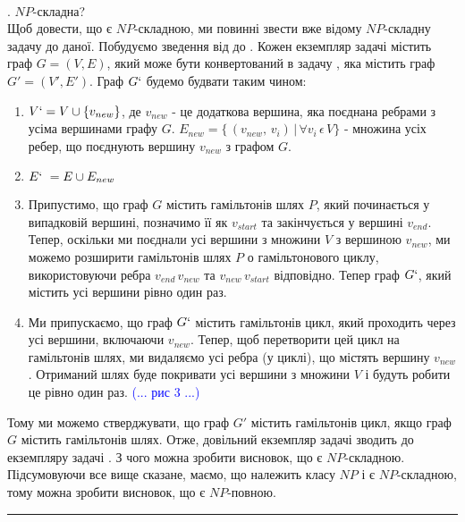 \documentclass[14pt]{article}
\begin{document}
\begin{spacing}{1.175}
        
        \\
        . \hamcycle \(NP\)-складна? \\
        Щоб довести, що \hamcycle є \(NP\)-складною, ми повинні звести вже відому \(NP\)-складну задачу до даної. Побудуємо зведення від \dhampath до \hamcycle. Кожен екземпляр задачі \dhampath містить граф \(G = (V, E) \), який може бути конвертований в задачу \hamcycle, яка містить граф \(G' = (V', E')\). Граф \(G`\) будемо будвати таким чином:
        \begin{enumerate}
            \item \(V` = V \cup \{v_{new}\}\), де \(v_{new}\) - це додаткова вершина, яка поєднана ребрами з усіма вершинами графу \(G\). \(E_{new} = \{\,(v_{new},\,v_i)\,|\,\forall v_i\,\epsilon\,V\}\) - множина усіх ребер, що поєднують вершину \(v_{new}\) з графом \(G\).
            \item \(E`\ = E \cup E_{new}\) 
            \item Припустимо, що граф \(G\) містить гамільтонів шлях \(P\), який починається у випадковій вершині, позначимо її як \(v_{start}\) та закінчується у вершині \(v_{end}\). Тепер, оскільки ми поєднали усі вершини з множини \(V\) з вершиною \(v_{new}\), ми можемо розширити гамільтонів шлях \(P\) о гамільтонового циклу, використовуючи ребра \(v_{end}\, v_{new}\) та \(v_{new}\, v_{start}\) відповідно. Тепер граф \(G`\), який містить усі вершини рівно один раз.
            \item Ми припускаємо, що граф \(G`\) містить гамільтонів цикл, який проходить через усі вершини, включаючи \(v_{new}\). Тепер, щоб перетворити цей цикл на гамільтонів шлях, ми видаляємо усі ребра (у циклі), що містять вершину \(v_{new}\). Отриманий шлях буде покривати усі вершини з множини \(V\) і будуть робити це рівно один раз. \textcolor{blue}{(... рис 3 ...)}
        \end{enumerate}
        \quad Тому ми можемо стверджувати, що граф \(G'\) містить гамільтонів цикл, якщо граф \(G\) містить гамільтонів шлях. Отже, довільний екземпляр задачі \hamcycle зводить до екземпляру задачі \dhampath. З чого можна зробити висновок, що \hamcycle є \(NP\)-складною.\\
        
        \quad Підсумовуючи все вище сказане, маємо, що \hamcycle належить класу \(NP\) і є \(NP\)-складною, тому можна зробити висновок, що \hamcycle є \(NP\)-повною.

        
    \hspace{15cm} \rule{0.7em}{0.7em}
    

\end{spacing}
\end{document}

